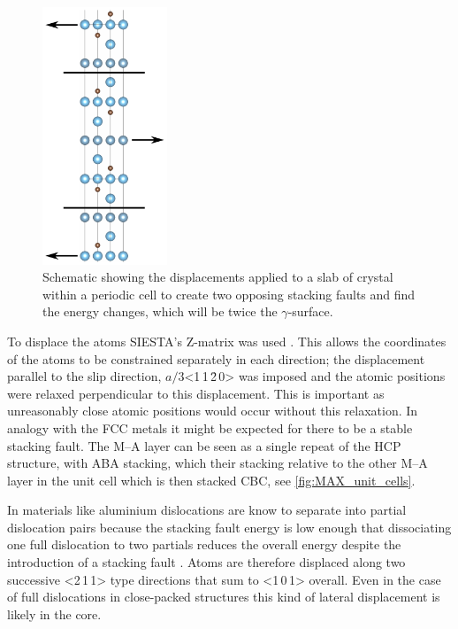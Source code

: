 \begin{figure}
\centering
\captionsetup{width=0.45\textwidth}
\includegraphics[width=0.3333\textwidth]{displacements_for_gamma_surface}
\caption[Schematic displacements during the simulation of the \texorpdfstring{$\gamma$}{gamma}-surface.]{Schematic showing the displacements applied to a slab of crystal within a periodic cell to create two opposing stacking faults and find the energy changes, which will be twice the $\gamma$-surface. \label{fig:DFT_gamma_surface}}
\end{figure}

To displace the atoms SIESTA's Z-matrix was used \cite{SIESTA_manual}. This allows the coordinates of the atoms to be constrained separately in each direction; the displacement parallel to the slip direction, $a/3$<1\,1\,\={2}\,0> was imposed and the atomic positions were relaxed perpendicular to this displacement. This is important as unreasonably close atomic positions would occur without this relaxation. In analogy with the FCC metals it might be expected for there to be a stable stacking fault. The M--A layer can be seen as a single repeat of the HCP structure, with ABA stacking, which their stacking relative to the other M--A layer in the unit cell which is then stacked CBC, see \autoref{fig:MAX_unit_cells}. 

In materials like aluminium dislocations are know to separate into partial dislocation pairs because the stacking fault energy is low enough that dissociating one full dislocation to two partials reduces the overall energy despite the introduction of a stacking fault \cite{kelly2012ch9}. Atoms are therefore displaced along two successive <2\,1\,1> type directions that sum to <1\,0\,1> overall. Even in the case of full dislocations in close-packed structures this kind of lateral displacement is likely in the core. 

